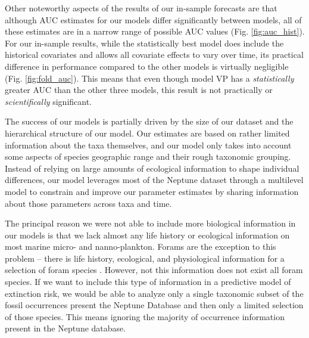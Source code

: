 \documentclass[12pt,letterpaper]{article}
\begin{document}
\begin{refsection}
Other noteworthy aspects of the results of our in-sample forecasts are that although AUC estimates for our models differ significantly between models, all of these estimates are in a narrow range of possible AUC values (Fig. \ref{fig:auc_hist}). For our in-sample results, while the statistically best model does include the historical covariates and allows all covariate effects to vary over time, its practical difference in performance compared to the other models is virtually negligible (Fig. \ref{fig:fold_auc}). This means that even though model VP has a \textit{statistically} greater AUC than the other three models, this result is not practically or \textit{scientifically} significant. 


The success of our models is partially driven by the size of our dataset and the hierarchical structure of our model. Our estimates are based on rather limited information about the taxa themselves, and our model only takes into account some aspects of species geographic range and their rough taxonomic grouping. Instead of relying on large amounts of ecological information to shape individual differences, our model leverages most of the Neptune dataset through a multilevel model to constrain and improve our parameter estimates by sharing information about those parameters across taxa and time.

The principal reason we were not able to include more biological information in our models is that we lack almost any life history or ecological information on most marine micro- and nanno-plankton. Forams are the exception to this problem -- there is life history, ecological, and physiological information for a selection of foram species \citep{Ezard2011}. However, not this information does not exist all foram species. If we want to include this type of information in a predictive model of extinction risk, we would be able to analyze only a single taxonomic subset of the fossil occurrences present the Neptune Database and then only a limited selection of those species. This means ignoring the majority of occurrence information present in the Neptune database.


\end{refsection}
\end{document}
